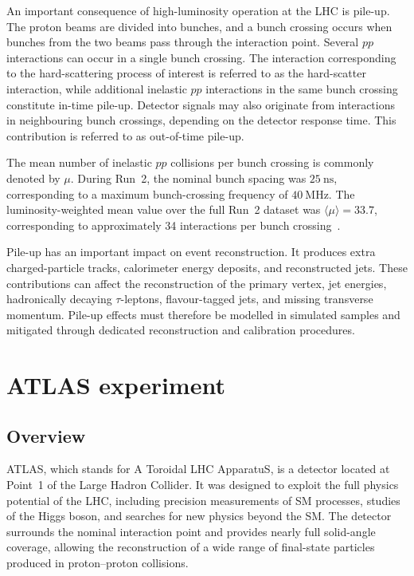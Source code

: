 An important consequence of high-luminosity operation at the LHC is pile-up.
The proton beams are divided into bunches, and a bunch crossing occurs when bunches from the two beams pass through the interaction point.
Several $pp$ interactions can occur in a single bunch crossing.
The interaction corresponding to the hard-scattering process of interest is referred to as the hard-scatter interaction, while additional inelastic $pp$ interactions in the same bunch crossing constitute in-time pile-up.
Detector signals may also originate from interactions in neighbouring bunch crossings, depending on the detector response time. This contribution is referred to as out-of-time pile-up.

The mean number of inelastic $pp$ collisions per bunch crossing is commonly denoted by $\mu$.
During Run~2, the nominal bunch spacing was $25~\mathrm{ns}$, corresponding to a maximum bunch-crossing frequency of $40~\mathrm{MHz}$.
The luminosity-weighted mean value over the full Run~2 dataset was $\langle\mu\rangle=33.7$, corresponding to approximately 34 interactions per bunch crossing~\cite{ATLASDataQualityRun2}.

Pile-up has an important impact on event reconstruction.
It produces extra charged-particle tracks, calorimeter energy deposits, and reconstructed jets.
These contributions can affect the reconstruction of the primary vertex, jet energies, hadronically decaying $\tau$-leptons, flavour-tagged jets, and missing transverse momentum. Pile-up effects must therefore be modelled in simulated samples and mitigated through dedicated reconstruction and calibration procedures.


\section{ATLAS experiment}
\label{sec:atlas_experiment}

\subsection{Overview}
\label{subsec:atlas_overview}

ATLAS, which stands for A Toroidal LHC ApparatuS, is a detector located at Point~1 of the Large Hadron Collider.
It was designed to exploit the full physics potential of the LHC, including precision measurements of SM processes, studies of the Higgs boson, and searches for new physics beyond the SM.
The detector surrounds the nominal interaction point and provides nearly full solid-angle coverage, allowing the reconstruction of a wide range of final-state particles produced in proton--proton collisions.

